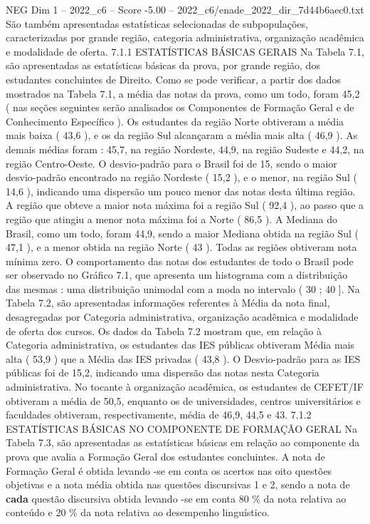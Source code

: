 \begin{textsample}{NEG Dim 1 – 2022\_c6 – Score -5.00 – 2022\_c6/enade\_2022\_dir\_7d44b6aec0.txt}
São também apresentadas estatísticas selecionadas de subpopulações, caracterizadas por grande região, categoria administrativa, organização acadêmica e modalidade de oferta. 7.1.1 ESTATÍSTICAS BÁSICAS GERAIS Na Tabela 7.1, são apresentadas as estatísticas básicas da prova, por grande região, dos estudantes concluintes de Direito.
Como se pode verificar, a partir dos dados mostrados na Tabela 7.1, a média das notas da prova, como um todo, foram 45,2 ( nas seções seguintes serão analisados os Componentes de Formação Geral e de Conhecimento Específico ).
Os estudantes da região Norte obtiveram a média mais baixa ( 43,6 ), e os da região Sul alcançaram a média mais alta ( 46,9 ).
As demais médias foram : 45,7, na região Nordeste, 44,9, na região Sudeste e 44,2, na região Centro-Oeste.
O desvio-padrão para o Brasil foi de 15, sendo o maior desvio-padrão encontrado na região Nordeste ( 15,2 ), e o menor, na região Sul ( 14,6 ), indicando uma dispersão um pouco menor das notas desta última região.
A região que obteve a maior nota máxima foi a região Sul ( 92,4 ), ao passo que a região que atingiu a menor nota máxima foi a Norte ( 86,5 ).
A Mediana do Brasil, como um todo, foram 44,9, sendo a maior Mediana obtida na região Sul ( 47,1 ), e a menor obtida na região Norte ( 43 ).
Todas as regiões obtiveram nota mínima zero.
O comportamento das notas dos estudantes de todo o Brasil pode ser observado no Gráfico 7.1, que apresenta um histograma com a distribuição das mesmas : uma distribuição unimodal com a moda no intervalo ( 30 ; 40 ].
Na Tabela 7.2, são apresentadas informações referentes à Média da nota final, desagregadas por Categoria administrativa, organização acadêmica e modalidade de oferta dos cursos.
Os dados da Tabela 7.2 mostram que, em relação à Categoria administrativa, os estudantes das IES públicas obtiveram Média mais alta ( 53,9 ) que a Média das IES privadas ( 43,8 ).
O Desvio-padrão para as IES públicas foi de 15,2, indicando uma dispersão das notas nesta Categoria administrativa.
No tocante à organização acadêmica, os estudantes de CEFET/IF obtiveram a média de 50,5, enquanto os de universidades, centros universitários e faculdades obtiveram, respectivamente, média de 46,9, 44,5 e 43. 7.1.2 ESTATÍSTICAS BÁSICAS NO COMPONENTE DE FORMAÇÃO GERAL Na Tabela 7.3, são apresentadas as estatísticas básicas em relação ao componente da prova que avalia a Formação Geral dos estudantes concluintes.
A nota de Formação Geral é obtida levando -se em conta os acertos nas oito questões objetivas e a nota média obtida nas questões discursivas 1 e 2, sendo a nota de \textbf{cada} questão discursiva obtida levando -se em conta 80 \% da nota relativa ao conteúdo e 20 \% da nota relativa ao desempenho linguístico.

\end{textsample}
